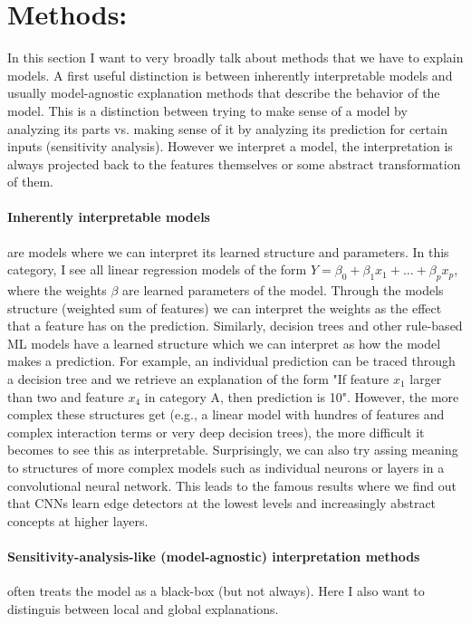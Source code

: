 \documentclass[runningheads]{llncs}
\begin{document}
\section{Methods:}

In this section I want to very broadly talk about methods that we have to explain models.
A first useful distinction is between inherently interpretable models and usually model-agnostic explanation methods that describe the behavior of the model.
This is a distinction between trying to make sense of a model by analyzing its parts vs. making sense of it by analyzing its prediction for certain inputs (sensitivity analysis).
However we interpret a model, the interpretation is always projected back to the features themselves or some abstract transformation of them.

\paragraph{Inherently interpretable models} are models where we can interpret its learned structure and parameters.
In this category, I see all linear regression models of the form $Y = \beta_0 + \beta_1 x_1 + \ldots + \beta_p x_p$, where the weights $\beta$ are learned parameters of the model.
Through the models structure (weighted sum of features) we can interpret the weights as the effect that a feature has on the prediction.
Similarly, decision trees and other rule-based ML models have a learned structure which we can interpret as how the model makes a prediction.
For example, an individual prediction can be traced through a decision tree and we retrieve an explanation of the form "If feature $x_1$ larger than two and feature $x_4$ in category A, then prediction is 10".
However, the more complex these structures get (e.g., a linear model with hundres of features and complex interaction terms or very deep decision trees), the more difficult it becomes to see this as interpretable.
Surprisingly, we can also try assing meaning to structures of more complex models such as individual neurons or layers in a convolutional neural network.
This leads to the famous results where we find out that CNNs learn edge detectors at the lowest levels and increasingly abstract concepts at higher layers.

\paragraph{Sensitivity-analysis-like (model-agnostic) interpretation methods} often treats the model as a black-box (but not always).
Here I also want to distinguis between local and global explanations.
\end{document}
